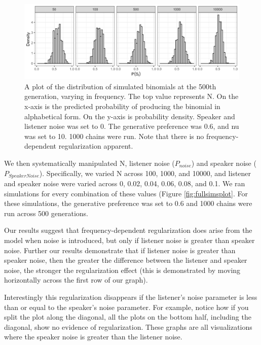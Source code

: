 \documentclass[10pt, letterpaper]{article}
\newenvironment{CodeChunk}{}{}
\begin{document}
\begin{CodeChunk}
\begin{figure}[tb]

{\centering \includegraphics[width=1\linewidth]{Figures/noNoise} 

}

\caption[A plot of the distribution of simulated binomials at the 500th generation, varying in frequency]{A plot of the distribution of simulated binomials at the 500th generation, varying in frequency. The top value represents N. On the x-axis is the predicted probability of producing the binomial in alphabetical form. On the y-axis is probability density. Speaker and listener noise was set to 0. The generative preference was 0.6, and nu was set to 10. 1000 chains were run. Note that there is no frequency-dependent regularization apparent.}\label{fig:noNoisePlot}
\end{figure}
\end{CodeChunk}

We then systematically manipulated N, listener noise (\(P_{noise}\)) and
speaker noise (\(P_{SpeakerNoise}\)). Specifically, we varied N across
100, 1000, and 10000, and listener and speaker noise were varied across
0, 0.02, 0.04, 0.06, 0.08, and 0.1. We ran simulations for every
combination of these values (Figure \ref{fig:fullsimsplot}. For these
simulations, the generative preference was set to 0.6 and 1000 chains
were run across 500 generations.

Our results suggest that frequency-dependent regularization does arise
from the model when noise is introduced, but only if listener noise is
greater than speaker noise. Further our results demonstrate that if
listener noise is greater than speaker noise, then the greater the
difference between the listener and speaker noise, the stronger the
regularization effect (this is demonstrated by moving horizontally
across the first row of our graph).

Interestingly this regularization disappears if the listener's noise
parameter is less than or equal to the speaker's noise parameter. For
example, notice how if you split the plot along the diagonal, all the
plots on the bottom half, including the diagonal, show no evidence of
regularization. These graphs are all visualizations where the speaker
noise is greater than the listener noise.
\end{document}
